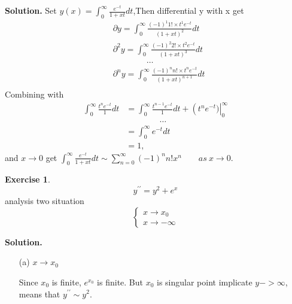 \documentclass[a4paper]{book}
\newenvironment{solution}%
{\noindent\textbf{Solution.}}%
{\qedhere}
\numberwithin{equation}{chapter}
\theoremstyle{definition}
\newtheorem{exc}[exm]{Exercise}
\begin{document}
\begin{multicols}{2}
\begin{solution}
	Set $ y(x) = \int_{0}^{\infty} \frac{e^{-t}}{1+xt} dt $,Then differential y with x get 
	\begin{equation} \label{1:3:2}
	\begin{aligned}
		&\partial y = \int_{0}^{\infty} \frac{(-1)^1 1! \times t^1 e^{-t}}{(1+xt)^2} dt \\
		&\partial^2 y =  \int_{0}^{\infty} \frac{(-1)^2 2! \times t^2 e^{-t}}{(1+xt)^3} dt \\
		& \qquad \qquad \dots \\
		&\partial^n y =  \int_{0}^{\infty} \frac{(-1)^n n! \times t^n e^{-t}}{(1+xt)^{n+1}} dt \\
		\end{aligned}
	\end{equation}
	Combining with 
	\begin{equation}
		\begin{aligned}
		\int_{0}^{\infty} \frac{t^n e^{-t}}{1} dt &= \int_{0}^{\infty} \frac{t^{n-1} e^{-t}}{1} dt + \left(t^n e^{-t})\right|_0^\infty \\
		&\qquad \qquad \dots \\
		&= \int_{0}^{\infty} e^{-t} dt \\
		&= 1,
		\end{aligned}
	\end{equation}
	and $ x \rightarrow 0 $ get $\int_{0}^{\infty} \frac{e^{-t}}{1+xt} dt \sim \sum_{n=0}^{\infty}(-1)^n n! x^n \qquad as \ x \rightarrow 0 .$
\end{solution}

\begin{exc}
	\begin{equation}\label{1:4:1}
		y^{\prime \prime} = y^2 + e^x
	\end{equation}
	analysis two situation 
	\begin{equation}\nonumber
	\begin{cases}
		 x \rightarrow x_0 \\
		 x \rightarrow -\infty
	\end{cases}
	\end{equation}
\end{exc}

\begin{solution}
	\begin{itemize}
		\item [(a)]$x \rightarrow x_0$
		
	Since $x_0$ is finite, $e^{x_0} $ is finite. But $x_0$ is singular point implicate $y -> \infty$, means that $ y^{\prime \prime} \sim y^2 $.
	

\end{itemize}
\end{solution}
\end{multicols}
\end{document}

